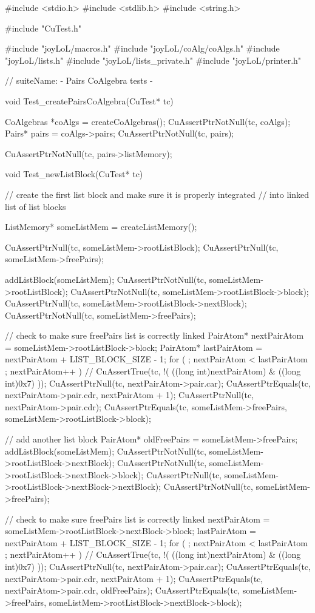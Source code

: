 \starttyping
#include <stdio.h>
#include <stdlib.h>
#include <string.h>

#include "CuTest.h"

#include "joyLoL/macros.h"
#include "joyLoL/coAlg/coAlgs.h"
#include "joyLoL/lists.h"
#include "joyLoL/lists_private.h"
#include "joyLoL/printer.h"

// suiteName: - Pairs CoAlgebra tests -

void Test_createPairsCoAlgebra(CuTest* tc) {
  CoAlgebras *coAlgs = createCoAlgebras();
  CuAssertPtrNotNull(tc, coAlgs);
  Pairs* pairs = coAlgs->pairs;
  CuAssertPtrNotNull(tc, pairs);

  CuAssertPtrNotNull(tc, pairs->listMemory);
}

void Test_newListBlock(CuTest* tc) {
  // create the first list block and make sure it is properly integrated
  // into linked list of list blocks

  ListMemory* someListMem = createListMemory();

  CuAssertPtrNull(tc, someListMem->rootListBlock);
  CuAssertPtrNull(tc, someListMem->freePairs);

  addListBlock(someListMem);
  CuAssertPtrNotNull(tc, someListMem->rootListBlock);
  CuAssertPtrNotNull(tc, someListMem->rootListBlock->block);
  CuAssertPtrNull(tc, someListMem->rootListBlock->nextBlock);
  CuAssertPtrNotNull(tc, someListMem->freePairs);

  // check to make sure freePairs list is correctly linked
  PairAtom* nextPairAtom = someListMem->rootListBlock->block;
  PairAtom* lastPairAtom = nextPairAtom + LIST_BLOCK_SIZE - 1;
  for ( ; nextPairAtom < lastPairAtom ; nextPairAtom++ ) {
//    CuAssertTrue(tc, !( ((long int)nextPairAtom) & ((long int)0x7) ));
    CuAssertPtrNull(tc, nextPairAtom->pair.car);
    CuAssertPtrEquals(tc, nextPairAtom->pair.cdr, nextPairAtom + 1);
  }
  CuAssertPtrNull(tc, nextPairAtom->pair.cdr);
  CuAssertPtrEquals(tc, someListMem->freePairs, someListMem->rootListBlock->block);

  // add another list block
  PairAtom* oldFreePairs = someListMem->freePairs;
  addListBlock(someListMem);
  CuAssertPtrNotNull(tc, someListMem->rootListBlock->nextBlock);
  CuAssertPtrNotNull(tc, someListMem->rootListBlock->nextBlock->block);
  CuAssertPtrNull(tc, someListMem->rootListBlock->nextBlock->nextBlock);
  CuAssertPtrNotNull(tc, someListMem->freePairs);

  // check to make sure freePairs list is correctly linked
  nextPairAtom = someListMem->rootListBlock->nextBlock->block;
  lastPairAtom = nextPairAtom + LIST_BLOCK_SIZE - 1;
  for ( ; nextPairAtom < lastPairAtom ; nextPairAtom++ ) {
//    CuAssertTrue(tc, !( ((long int)nextPairAtom) & ((long int)0x7) ));
    CuAssertPtrNull(tc, nextPairAtom->pair.car);
    CuAssertPtrEquals(tc, nextPairAtom->pair.cdr, nextPairAtom + 1);
  }
  CuAssertPtrEquals(tc, nextPairAtom->pair.cdr, oldFreePairs);
  CuAssertPtrEquals(tc, someListMem->freePairs, someListMem->rootListBlock->nextBlock->block);
}

